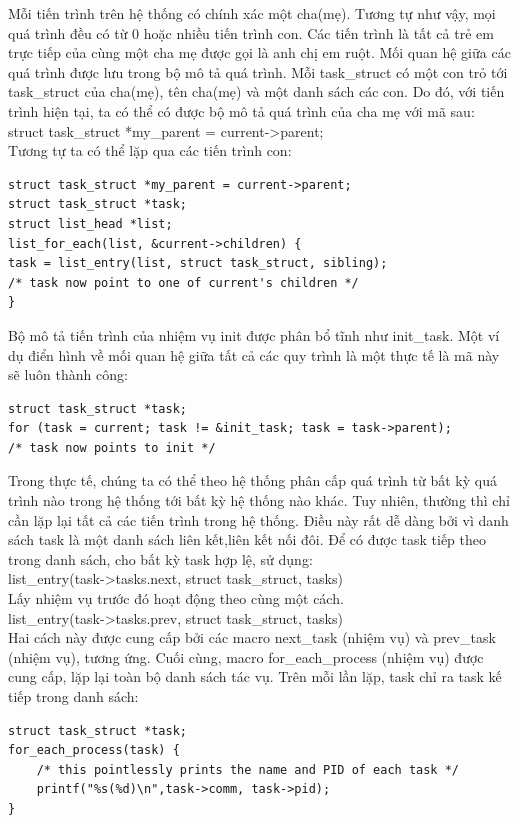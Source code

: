 \documentclass[a4paper,10pt]{report}
\begin{document}
Mỗi tiến trình trên hệ thống có chính xác một cha(mẹ). Tương tự như vậy, mọi quá trình đều có từ 0 hoặc nhiều tiến trình con. Các tiến trình là tất cả trẻ em trực tiếp của cùng một cha mẹ được gọi là anh chị em ruột. Mối quan hệ giữa các quá trình được lưu trong bộ mô tả quá trình. Mỗi task\_struct có một con trỏ tới task\_struct của cha(mẹ), tên cha(mẹ) và một danh sách các con. Do đó, với tiến trình hiện tại, ta có thể có được bộ mô tả quá trình của cha mẹ với mã sau: \\
struct task\_struct *my\_parent = current->parent; \\
Tương tự ta có thể lặp qua các tiến trình con: \\
\begin{lstlisting}
struct task_struct *my_parent = current->parent;
struct task_struct *task;
struct list_head *list;
list_for_each(list, &current->children) {
task = list_entry(list, struct task_struct, sibling);
/* task now point to one of current's children */
}
\end{lstlisting}
Bộ mô tả tiến trình của nhiệm vụ init được phân bổ tĩnh như init\_task. Một ví dụ điển hình về mối quan hệ giữa tất cả các quy trình là một thực tế là mã này sẽ luôn thành công:\\
\begin{lstlisting}
struct task_struct *task;
for (task = current; task != &init_task; task = task->parent);
/* task now points to init */
\end{lstlisting}
Trong thực tế, chúng ta có thể theo hệ thống phân cấp quá trình từ bất kỳ quá trình nào trong hệ thống tới bất kỳ hệ thống nào khác. Tuy nhiên, thường thì chỉ cần lặp lại tất cả các tiến trình trong hệ thống. Điều này rất dễ dàng bởi vì danh sách task là một danh sách liên kết,liên kết nối đôi. Để có được task tiếp theo trong danh sách, cho bất kỳ task hợp lệ, sử dụng: \\
list\_entry(task->tasks.next, struct task\_struct, tasks) \\

Lấy nhiệm vụ trước đó hoạt động theo cùng một cách. \\
list\_entry(task->tasks.prev, struct task\_struct, tasks) \\ 

Hai cách này được cung cấp bởi các macro next\_task (nhiệm vụ) và prev\_task (nhiệm vụ), tương ứng. Cuối cùng, macro for\_each\_process (nhiệm vụ) được cung cấp, lặp lại toàn bộ danh sách tác vụ. Trên mỗi lần lặp, task chỉ ra task kế tiếp trong danh sách:
\begin{lstlisting}
struct task_struct *task;
for_each_process(task) {
	/* this pointlessly prints the name and PID of each task */
	printf("%s(%d)\n",task->comm, task->pid);
}
\end{lstlisting}
\end{document}

